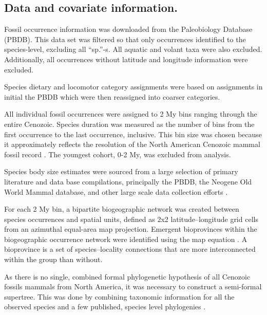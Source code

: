\documentclass{nature}
\begin{document}
\begin{methods}

  \subsection{Data and covariate information.}
  Fossil occurrence information was downloaded from the Paleobiology Database (PBDB). This data set was filtered so that only occurrences identified to the species-level, excluding all ``sp.''-s. All aquatic and volant taxa were also excluded. Additionally, all occurrences without latitude and longitude information were excluded.

  Species dietary and locomotor category assignments were based on assignments in initial the PBDB which were then reassigned into coarser categories.

  All individual fossil occurrences were assigned to 2 My bins ranging through the entire Cenozoic. Species duration was measured as the number of bins from the first occurrence to the last occurrence, inclusive. This bin size was chosen because it approximately reflects the resolution of the North American Cenozoic mammal fossil record \cite{Alroy2009,Marcot2014}. The youngest cohort, 0-2 My, was excluded from analysis.

  Species body size estimates were sourced from a large selection of primary literature and data base compilations, principally the PBDB, the Neogene Old World Mammal database, and other large scale data collection efforts \cite{Jones2009c,Smith2004c,Raia2012f,Freudenthal2013,McKenna2011}. 

  For each 2 My bin, a bipartite biogeographic network was created between species occurrences and spatial units, defined as 2x2 latitude--longitude grid cells from an azimuthal equal-area map projection. Emergent bioprovinces within the biogeographic occurrence network were identified using the map equation \cite{Rosvall2008,Vilhena2013}. A bioprovince is a set of species--locality connections that are more interconnected within the group than without.

  As there is no single, combined formal phylogenetic hypothesis of all Cenozoic fossils mammals from North America, it was necessary to construct a semi-formal supertree. This was done by combining taxonomic information for all the observed species and a few published, species level phylogenies \cite{Raia2012f,Janis1998,Janis2008}.



\end{methods}
\end{document}
